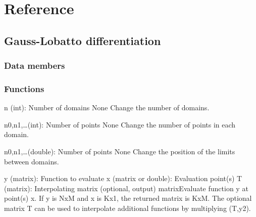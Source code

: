 \section{Reference}

\renewcommand{\funclistcolumns}{3}

\subsection{Gauss-Lobatto differentiation}
\subsubsection{Data members}


\subsubsection{Functions}

{n (int): Number of domains}
{None}
{Change the number of domains.}

{n0,n1,\ldots (int): Number of points}
{None}
{Change the number of points in each domain.}

{n0,n1,\ldots (double): Number of points}
{None}
{Change the position of the limits between domains.}


{y (matrix): Function to evaluate\newline
x (matrix or double): Evaluation point(s)\newline
T (matrix): Interpolating matrix (optional, output) \newline
}{matrix}{Evaluate function y at point(s) x. If y is NxM and x is Kx1, the returned matrix is KxM.
The optional matrix T can be used to interpolate additional functions by multiplying (T,y2).} 

